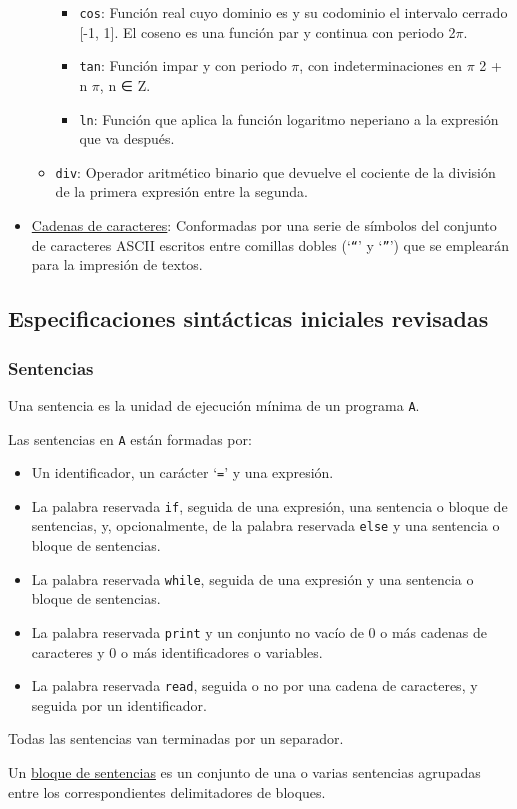 \documentclass[12pt]{article}
\begin{document}
\begin{itemize}
\begin{itemize}
\begin{itemize}
            \item \texttt{cos}: Función real cuyo dominio es  y su codominio el intervalo cerrado [-1, 1]. El coseno es una función par y continua con periodo 2$\pi$.
            \item \texttt{tan}: Función impar y con periodo $\pi$, con indeterminaciones en $\pi$ 2 + n $\pi$, n ∈ Z.
            \item  \texttt{ln}: Función que aplica la función logaritmo neperiano a la expresión que va después.
        \end{itemize}
        \item \texttt{div}: Operador aritmético binario que devuelve el cociente de la división de la primera expresión entre la segunda.
    \end{itemize}
    \item \underline{Cadenas de caracteres}: Conformadas por una serie de símbolos del conjunto de caracteres ASCII escritos entre comillas dobles (`\texttt{``}' y `\texttt{''}')  que se emplearán para la impresión de textos.
\end{itemize}

\subsection{Especificaciones sintácticas iniciales revisadas}
\subsubsection{Sentencias}
Una sentencia es la unidad de ejecución mínima de un programa \texttt{A}.\par
Las sentencias en \texttt{A} están formadas por:
\begin{itemize}
    \item Un identificador, un carácter `\texttt{=}' y una expresión.
    \item La palabra reservada \texttt{if}, seguida de una expresión, una sentencia o bloque de sentencias, y, opcionalmente, de la palabra reservada \texttt{else} y una sentencia o bloque de sentencias.
    \item La palabra reservada \texttt{while}, seguida de una expresión y una sentencia o bloque de sentencias.
    \item La palabra reservada \texttt{print} y un conjunto no vacío de 0 o más cadenas de caracteres y 0 o más identificadores o variables.
    \item La palabra reservada \texttt{read}, seguida o no por una cadena de caracteres, y seguida por un identificador.
\end{itemize}
Todas las sentencias van terminadas por un separador.\par
Un \underline{bloque de sentencias} es un conjunto de una o varias sentencias agrupadas entre los correspondientes delimitadores de bloques.
\end{document}
